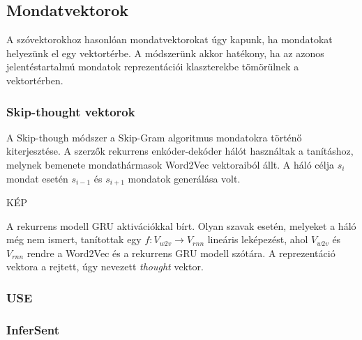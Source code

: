 \subsection{Mondatvektorok}
A szóvektorokhoz hasonlóan mondatvektorokat úgy kapunk, ha mondatokat helyezünk el egy vektortérbe. A módszerünk akkor hatékony, ha az azonos jelentéstartalmú mondatok reprezentációi klaszterekbe tömörülnek a vektortérben.


\subsubsection{Skip-thought vektorok}
A Skip-though módszer a Skip-Gram algoritmus mondatokra történő kiterjesztése. A szerzők rekurrens enkóder-dekóder hálót használtak a tanításhoz, melynek bemenete mondathármasok Word2Vec vektoraiból állt. A háló célja $s_i$ mondat esetén $s_{i-1}$ és $s_{i+1}$ mondatok generálása volt.

KÉP

A rekurrens modell GRU aktivációkkal bírt.
Olyan szavak esetén, melyeket a háló még nem ismert, tanítottak egy $f:V_{w2v} \rightarrow V_{rnn}$ lineáris leképezést, ahol $V_{w2v}$ és $V_{rnn}$ rendre a Word2Vec és a rekurrens GRU modell szótára. A reprezentáció vektora a rejtett, úgy nevezett \textit{thought} vektor.

\subsubsection{USE}

\subsubsection{InferSent}




